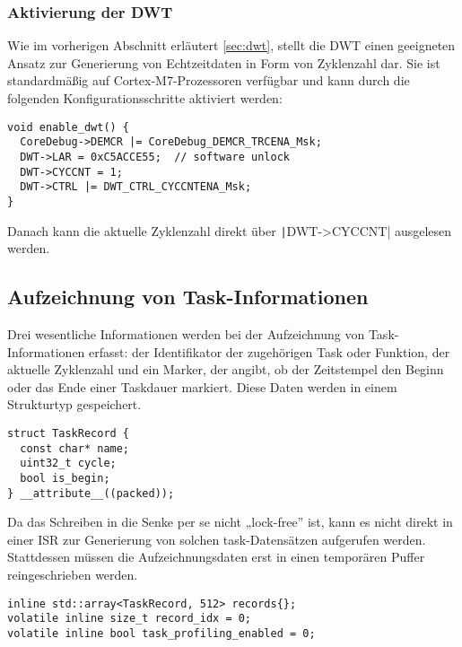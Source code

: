 \subsubsection{Aktivierung der DWT}

Wie im vorherigen Abschnitt erläutert \ref{sec:dwt}, stellt die DWT einen
geeigneten Ansatz zur Generierung von Echtzeitdaten in Form von Zyklenzahl dar.
Sie ist standardmäßig auf Cortex-M7-Prozessoren verfügbar und kann durch die
folgenden Konfigurationsschritte aktiviert werden:

\begin{code}
\begin{verbatim}
void enable_dwt() {
  CoreDebug->DEMCR |= CoreDebug_DEMCR_TRCENA_Msk;
  DWT->LAR = 0xC5ACCE55;  // software unlock
  DWT->CYCCNT = 1;
  DWT->CTRL |= DWT_CTRL_CYCCNTENA_Msk;
}
\end{verbatim}
\end{code}

Danach kann die aktuelle Zyklenzahl direkt über \texttt|DWT->CYCCNT|
ausgelesen werden.

\subsection{Aufzeichnung von Task-Informationen}

Drei wesentliche Informationen werden bei der Aufzeichnung von
Task-Informationen erfasst: der Identifikator der zugehörigen Task oder
Funktion, der aktuelle Zyklenzahl und ein Marker, der angibt, ob der Zeitstempel
den Beginn oder das Ende einer Taskdauer markiert. Diese Daten werden in einem
Strukturtyp gespeichert.

\begin{code}
\begin{verbatim}
struct TaskRecord {
  const char* name;
  uint32_t cycle;
  bool is_begin;
} __attribute__((packed));
\end{verbatim}
\end{code}

Da das Schreiben in die Senke per se nicht „lock-free” ist, kann es nicht direkt
in einer ISR zur Generierung von solchen task-Datensätzen aufgerufen werden.
Stattdessen müssen die Aufzeichnungsdaten erst in einen temporären Puffer
reingeschrieben werden.

\begin{code}
\begin{verbatim}
inline std::array<TaskRecord, 512> records{};
volatile inline size_t record_idx = 0;
volatile inline bool task_profiling_enabled = 0;
\end{verbatim}
\end{code}

